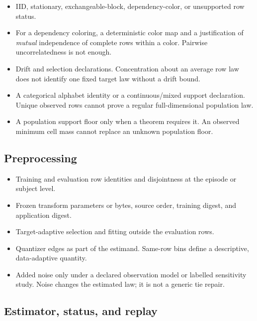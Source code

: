\documentclass[11pt]{article}
\begin{document}
\begin{itemize}
\item IID, stationary, exchangeable-block, dependency-color, or unsupported row status.
\item For a dependency coloring, a deterministic color map and a justification of \emph{mutual} independence of complete rows within a color.  Pairwise uncorrelatedness is not enough.
\item Drift and selection declarations.  Concentration about an average row law does not identify one fixed target law without a drift bound.
\item A categorical alphabet identity or a continuous/mixed support declaration.  Unique observed rows cannot prove a regular full-dimensional population law.
\item A population support floor only when a theorem requires it.  An observed minimum cell mass cannot replace an unknown population floor.
\end{itemize}

\subsection{Preprocessing}

\begin{itemize}
\item Training and evaluation row identities and disjointness at the episode or subject level.
\item Frozen transform parameters or bytes, source order, training digest, and application digest.
\item Target-adaptive selection and fitting outside the evaluation rows.
\item Quantizer edges as part of the estimand.  Same-row bins define a descriptive, data-adaptive quantity.
\item Added noise only under a declared observation model or labelled sensitivity study.  Noise changes the estimated law; it is not a generic tie repair.
\end{itemize}

\subsection{Estimator, status, and replay}
\end{document}
